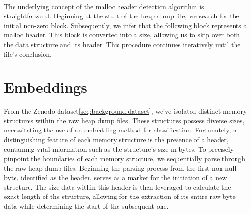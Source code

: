             \paragraph{}The underlying concept of the malloc header detection algorithm is straightforward. Beginning at the start of the heap dump file, we search for the initial non-zero block. Subsequently, we infer that the following block represents a malloc header. This block is converted into a size, allowing us to skip over both the data structure and its header. This procedure continues iteratively until the file's conclusion.
    \section{Embeddings}
        \paragraph{}From the Zenodo dataset\ref{seq:background:dataset}, we've isolated distinct memory structures within the raw heap dump files. These structures possess diverse sizes, necessitating the use of an embedding method for classification. Fortunately, a distinguishing feature of each memory structure is the presence of a header, containing vital information such as the structure's size in bytes. To precisely pinpoint the boundaries of each memory structure, we sequentially parse through the raw heap dump files. Beginning the parsing process from the first non-null byte, identified as the header, serves as a marker for the initiation of a new structure. The size data within this header is then leveraged to calculate the exact length of the structure, allowing for the extraction of its entire raw byte data while determining the start of the subsequent one.
        
